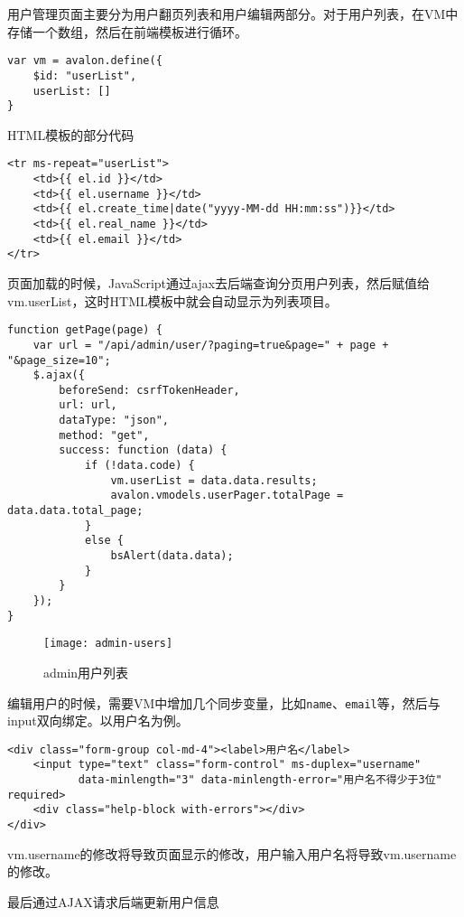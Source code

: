 用户管理页面主要分为用户翻页列表和用户编辑两部分。对于用户列表，在VM中存储一个数组，然后在前端模板进行循环。

\begin{verbatim}
var vm = avalon.define({
    $id: "userList",
    userList: []
}
\end{verbatim}

HTML模板的部分代码

\begin{verbatim}
<tr ms-repeat="userList">
    <td>{{ el.id }}</td>
    <td>{{ el.username }}</td>
    <td>{{ el.create_time|date("yyyy-MM-dd HH:mm:ss")}}</td>
    <td>{{ el.real_name }}</td>
    <td>{{ el.email }}</td>
</tr>
\end{verbatim}

页面加载的时候，JavaScript通过ajax去后端查询分页用户列表，然后赋值给vm.userList，这时HTML模板中就会自动显示为列表项目。

\begin{verbatim}
function getPage(page) {
    var url = "/api/admin/user/?paging=true&page=" + page + "&page_size=10";
    $.ajax({
        beforeSend: csrfTokenHeader,
        url: url,
        dataType: "json",
        method: "get",
        success: function (data) {
            if (!data.code) {
                vm.userList = data.data.results;
                avalon.vmodels.userPager.totalPage = data.data.total_page;
            }
            else {
                bsAlert(data.data);
            }
        }
    });
}
\end{verbatim}

\begin{figure}[H]
\centering
\texttt{[image: admin-users]}
\caption{admin用户列表}
\end{figure}

编辑用户的时候，需要VM中增加几个同步变量，比如\texttt{name}、\texttt{email}等，然后与input双向绑定。以用户名为例。

\begin{verbatim}
<div class="form-group col-md-4"><label>用户名</label>
    <input type="text" class="form-control" ms-duplex="username"
           data-minlength="3" data-minlength-error="用户名不得少于3位" required>
    <div class="help-block with-errors"></div>
</div>
\end{verbatim}

vm.username的修改将导致页面显示的修改，用户输入用户名将导致vm.username的修改。

最后通过AJAX请求后端更新用户信息


